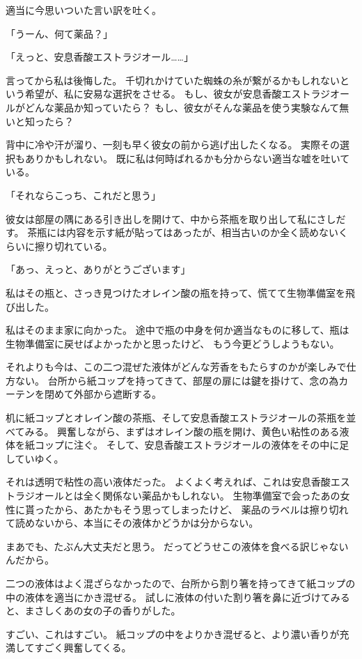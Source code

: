 適当に今思いついた言い訳を吐く。

「うーん、何て薬品？」

「えっと、安息香酸エストラジオール……」

言ってから私は後悔した。
千切れかけていた蜘蛛の糸が繋がるかもしれないという希望が、私に安易な選択をさせる。
もし、彼女が安息香酸エストラジオールがどんな薬品か知っていたら？
もし、彼女がそんな薬品を使う実験なんて無いと知ったら？

背中に冷や汗が溜り、一刻も早く彼女の前から逃げ出したくなる。
実際その選択もありかもしれない。
既に私は何時ばれるかも分からない適当な嘘を吐いている。

「それならこっち、これだと思う」

彼女は部屋の隅にある引き出しを開けて、中から茶瓶を取り出して私にさしだす。
茶瓶には内容を示す紙が貼ってはあったが、相当古いのか全く読めないくらいに擦り切れている。

「あっ、えっと、ありがとうございます」

私はその瓶と、さっき見つけたオレイン酸の瓶を持って、慌てて生物準備室を飛び出した。


私はそのまま家に向かった。
途中で瓶の中身を何か適当なものに移して、瓶は生物準備室に戻せばよかったかと思ったけど、
もう今更どうしようもない。

それよりも今は、この二つ混ぜた液体がどんな芳香をもたらすのかが楽しみで仕方ない。
台所から紙コップを持ってきて、部屋の扉には鍵を掛けて、念の為カーテンを閉めて外部から遮断する。

机に紙コップとオレイン酸の茶瓶、そして安息香酸エストラジオールの茶瓶を並べてみる。
興奮しながら、まずはオレイン酸の瓶を開け、黄色い粘性のある液体を紙コップに注ぐ。
そして、安息香酸エストラジオールの液体をその中に足していゆく。

それは透明で粘性の高い液体だった。
よくよく考えれば、これは安息香酸エストラジオールとは全く関係ない薬品かもしれない。
生物準備室で会ったあの女性に貰ったから、あたかもそう思ってしまったけど、
薬品のラベルは擦り切れて読めないから、本当にその液体かどうかは分からない。

まあでも、たぶん大丈夫だと思う。
だってどうせこの液体を食べる訳じゃないんだから。

二つの液体はよく混ざらなかったので、台所から割り箸を持ってきて紙コップの中の液体を適当にかき混ぜる。
試しに液体の付いた割り箸を鼻に近づけてみると、まさしくあの女の子の香りがした。

すごい、これはすごい。
紙コップの中をよりかき混ぜると、より濃い香りが充満してすごく興奮してくる。

